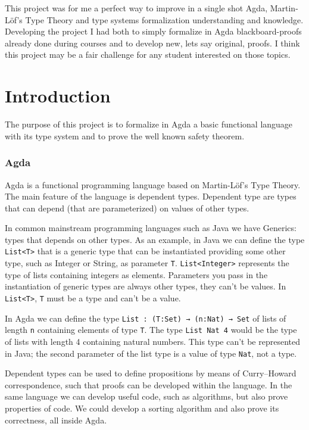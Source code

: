 \documentclass{article}
\begin{document}
\vspace{1em}
This project was for me a perfect way to improve in a single shot Agda, Martin-Löf's Type Theory and type systems formalization understanding and knowledge.
Developing the project I had both to simply formalize in Agda blackboard-proofs already done during courses and to develop new, lets say original, proofs.
I think this project may be a fair challenge for any student interested on those topics.


\section{Introduction}

The purpose of this project is to formalize in Agda a basic functional language with its type system and to prove the well known safety theorem.


\subsubsection*{Agda}
Agda is a functional programming language based on Martin-Löf's Type Theory.
The main feature of the language is dependent types.
Dependent type are types that can depend (that are parameterized) on values of other types.

In common mainstream programming languages such as Java we have Generics: types that depends on other types.
As an example, in Java we can define the type \texttt{List<T>} that is a generic type that can be instantiated providing some other type, such as Integer or String, as parameter \texttt{T}.
\texttt{List<Integer>} represents the type of lists containing integers as elements.
Parameters you pass in the instantiation of generic types are always other types, they can't be values.
In \texttt{List<T>}, \texttt{T} must be a type and can't be a value.

In Agda we can define the type \texttt{List : (T:Set) → (n:Nat) → Set} of lists of length \texttt{n} containing elements of type \texttt{T}.
The type \texttt{List Nat 4} would be the type of lists with length 4 containing natural numbers.
This type can't be represented in Java; the second parameter of the list type is a value of type \texttt{Nat}, not a type.

Dependent types can be used to define propositions by means of Curry–Howard correspondence, such that proofs can be developed within the language.
In the same language we can develop useful code, such as algorithms, but also prove properties of code.
We could develop a sorting algorithm and also prove its correctness, all inside Agda.
\end{document}
